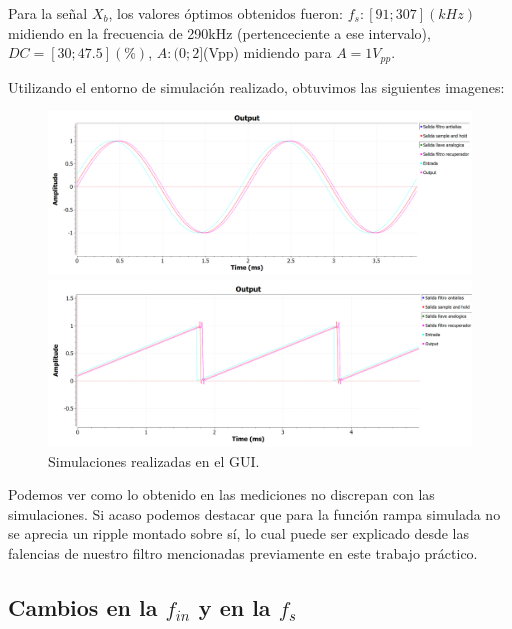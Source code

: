 \documentclass[../../ASSD_TP1_G7.tex]{subfiles}
\begin{document}
Para la señal $X_{b}$, los valores óptimos obtenidos fueron: $f_{s}:[91;307](kHz)$
midiendo en la frecuencia de 290kHz (pertenceciente a ese intervalo),
$DC=[30;47.5](\%)$, $A:(0;2]$(Vpp) midiendo para $A=1V_{pp}$.

Utilizando el entorno de simulación realizado, obtuvimos las siguientes
imagenes:

\begin{figure}[H]

\begin{centering}
\includegraphics[scale=0.5]{Imagenes/simulacion_syh_seno_a}
\par\end{centering}
\begin{centering}
\includegraphics[scale=0.5]{Imagenes/simulacion_syh_diente_a}\caption{Simulaciones realizadas en el GUI.}
\par\end{centering}
\end{figure}

Podemos ver como lo obtenido en las mediciones no discrepan con las
simulaciones. Si acaso podemos destacar que para la función rampa
simulada no se aprecia un ripple montado sobre sí, lo cual puede ser
explicado desde las falencias de nuestro filtro mencionadas previamente
en este trabajo práctico.

\subsection{Cambios en la $f_{in}$ y en la $f_{s}$}
\end{document}
